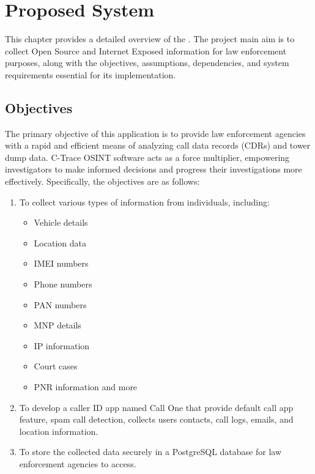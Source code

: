 
\chapter{Proposed System}\label{ch:proposed-system}
\justify

This chapter provides a detailed overview of the \textbf{{\myprojectname}}.
The project main aim is to collect Open Source and Internet Exposed information for law enforcement purposes, along with the objectives, assumptions, dependencies, and system requirements essential for its implementation.

\section{Objectives}\label{sec:objectives}

The primary objective of this application is to provide law enforcement agencies with a rapid and efficient means of analyzing call data records (CDRs) and tower dump data. C-Trace OSINT software acts as a force multiplier, empowering investigators to make informed decisions and progress their investigations more effectively. Specifically, the objectives are as follows:

\begin{enumerate}[label=\roman*.]
    \item To collect various types of information from individuals, including:
    \begin{itemize}
        \item Vehicle details
        \item Location data
        \item IMEI numbers
        \item Phone numbers
        \item PAN numbers
        \item MNP details
        \item IP information
        \item Court cases
        \item PNR information and more
    \end{itemize}
    \item To develop a caller ID app named Call One that provide default call app feature, spam call detection, collects users contacts, call logs, emails, and location information.

    \item To store the collected data securely in a PostgreSQL database for law enforcement agencies to access.

\end{enumerate}

